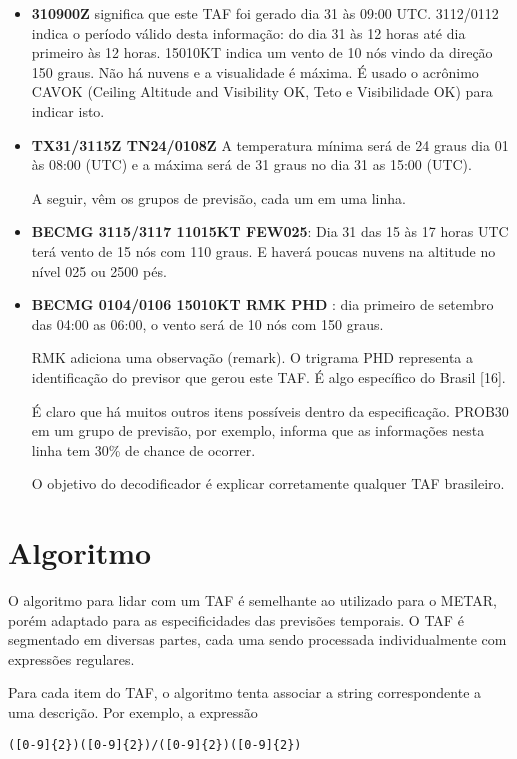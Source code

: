 \begin{itemize}
\item \textbf{310900Z} significa que este TAF foi gerado dia 31 às 09:00 UTC. 3112/0112 indica 
o período válido desta informação: do dia 31 às 
12 horas até dia primeiro às 12 horas. 15010KT indica um vento de 10 nós vindo 
da direção 150 graus. Não há nuvens e a visualidade é máxima. É usado o acrônimo 
CAVOK (Ceiling Altitude and Visibility OK, Teto e Visibilidade OK) para indicar isto.

\item \textbf{TX31/3115Z TN24/0108Z} A temperatura mínima será de 24 graus dia 01 às 08:00 (UTC) e a máxima será 
de 31 graus no dia 31 as 15:00 (UTC).

A seguir, vêm os grupos de previsão, cada um em uma linha.

\item \textbf{BECMG 3115/3117 11015KT FEW025}: Dia 31 das 15 às 17 horas UTC terá vento de 
15 nós com 110 graus. E haverá poucas nuvens na altitude no nível 025 ou 2500 pés.

\item \textbf{BECMG 0104/0106 15010KT RMK PHD} : dia primeiro de setembro das 04:00 as 06:00, 
o vento será de 10 nós com 150 graus.

RMK adiciona uma observação (remark). O trigrama PHD representa a identificação 
do previsor que gerou este TAF. É algo específico do Brasil [16].

É claro que há muitos outros itens possíveis dentro da especificação. PROB30 em 
um grupo de previsão, por exemplo, informa que as informações nesta linha tem 
30\% de chance de ocorrer.

O objetivo do decodificador é explicar corretamente qualquer TAF brasileiro.
\end{itemize}

\section{Algoritmo}

O algoritmo para lidar com um TAF é semelhante ao utilizado para o METAR, porém adaptado
para as especificidades das previsões temporais. O TAF é segmentado em diversas
partes, cada uma sendo processada individualmente com expressões regulares.

Para cada item do TAF, o algoritmo tenta associar a string correspondente a uma descrição.
Por exemplo, a expressão

\begin{verbatim}
([0-9]{2})([0-9]{2})/([0-9]{2})([0-9]{2})
\end{verbatim}

